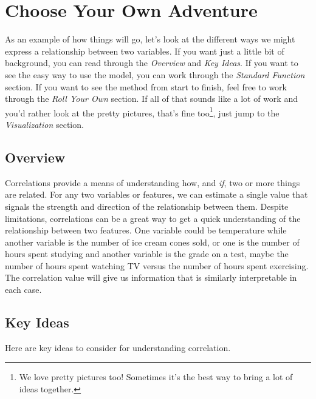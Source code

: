 \documentclass[
  letterpaper,
]{krantz}
\begin{document}
\section*{Choose Your Own Adventure}\label{choose-your-own-adventure}


As an example of how things will go, let's look at the different ways we
might express a relationship between two variables. If you want just a
little bit of background, you can read through the \emph{Overview} and
\emph{Key Ideas}. If you want to see the easy way to use the model, you
can work through the \emph{Standard Function} section. If you want to
see the method from start to finish, feel free to work through the
\emph{Roll Your Own} section. If all of that sounds like a lot of work
and you'd rather look at the pretty pictures, that's fine
too\footnote{We love pretty pictures too! Sometimes it's the best way to
  bring a lot of ideas together.}, just jump to the \emph{Visualization}
section.

\subsection*{Overview}\label{overview}

Correlations provide a means of understanding how, and \emph{if}, two or
more things are related. For any two variables or features, we can
estimate a single value that signals the strength and direction of the
relationship between them. Despite limitations, correlations can be a
great way to get a quick understanding of the relationship between two
features. One variable could be temperature while another variable is
the number of ice cream cones sold, or one is the number of hours spent
studying and another variable is the grade on a test, maybe the number
of hours spent watching TV versus the number of hours spent exercising.
The correlation value will give us information that is similarly
interpretable in each case.

\subsection*{Key Ideas}\label{key-ideas}

Here are key ideas to consider for understanding correlation.
\end{document}
